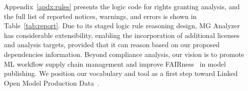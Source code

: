Appendix~\ref{apdx:rules} presents the logic code for rights granting analysis, and the full list of reported notices, warnings, and errors is shown in Table~\ref{tab:report}.
Due to its staged logic rule reasoning design, MG Analyzer has considerable extensibility, enabling the incorporation of additional licenses and analysis targets, provided that it can reason based on our proposed dependencies information.
Beyond compliance analysis, our vision is to promote ML workflow supply chain management and improve FAIRness~\cite{wilkinson2016fair} in model publishing. 
We position our vocabulary and tool as a first step toward Linked Open Model Production Data~\cite{bizer2008linked}.

